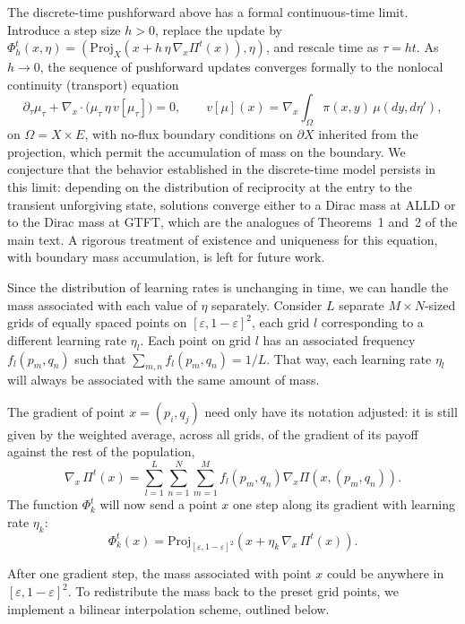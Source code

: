 \documentclass[10pt]{article}
\makeatletter
\newcommand{\eps}{\varepsilon}
\renewcommand\subsection{\@startsection{subsection}{2}{\z@}{-2.5ex \@plus -1ex \@minus -.2ex}{1ex \@plus .2ex}{\sffamily\bfseries\large}}
\makeatother
\begin{document}
The discrete-time pushforward above has a formal continuous-time limit. Introduce a step size $h > 0$, replace the update by $\Phi^t_h(x,\eta) = (\mathrm{Proj}_X(x + h\,\eta\, \nabla_x \Pi^t(x)), \eta)$, and rescale time as $\tau = h t$. As $h \to 0$, the sequence of pushforward updates converges formally to the nonlocal continuity (transport) equation
\[\partial_\tau \mu_\tau + \nabla_x \cdot \big(\mu_\tau \, \eta\, v[\mu_\tau]\big) = 0, \qquad v[\mu](x) = \nabla_x \int_\Omega \pi(x, y)\, \mu(dy, d\eta'),\]
on $\Omega = X \times E$, with no-flux boundary conditions on $\partial X$ inherited from the projection, which permit the accumulation of mass on the boundary. We conjecture that the behavior established in the discrete-time model persists in this limit: depending on the distribution of reciprocity at the entry to the transient unforgiving state, solutions converge either to a Dirac mass at ALLD or to the Dirac mass at GTFT, which are the analogues of Theorems~1 and~2 of the main text. A rigorous treatment of existence and uniqueness for this equation, with boundary mass accumulation, is left for future work.

\subsection{Implementation}

Since the distribution of learning rates is unchanging in time, we can handle the mass associated with each value of $\eta$ separately. Consider $L$ separate $M\times N$-sized grids of equally spaced points on $[\eps, 1-\eps]^2$, each grid $l$ corresponding to a different learning rate $\eta_l$. Each point on grid $l$ has an associated frequency $f_l{(p_m,q_n)}$ such that $\sum_{m, n} f_l(p_m, q_n) = 1/L$. That way, each learning rate $\eta_l$ will always be associated with the same amount of mass.

The gradient of point $x = (p_i, q_j)$ need only have its notation adjusted: it is still given by the weighted average, across all grids, of the gradient of its payoff against the rest of the population,
\[\nabla_{x} \, \Pi^t(x) = \sum_{l=1}^L\sum_{n=1}^N \sum_{m=1}^M f_l(p_m, q_n)  \nabla_{x} \Pi(x, (p_m, q_n)).\]
The function $\Phi_k^t$ will now send a point $x$ one step along its gradient with learning rate $\eta_k$: \[\Phi_k^t(x)= \mathrm{Proj}_{[\eps, 1-\eps]^2}(x + \eta_k\, \nabla_{x} \, \Pi^t(x)).\]

After one gradient step, the mass associated with point $x$ could be anywhere in $[\eps, 1-\eps]^2$. To redistribute the mass back to the preset grid points, we implement a bilinear interpolation scheme, outlined below.
\end{document}
